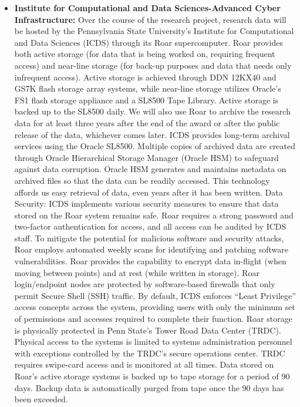 \documentclass[11pt]{article}
\begin{document}
\begin{itemize}
\item \textbf{Institute for Computational and Data Sciences-Advanced Cyber Infrastructure:}
Over the course of the research project, research data will be hosted by the Pennsylvania State University’s Institute for Computational and Data Sciences (ICDS) through its Roar supercomputer. Roar provides both active storage (for data that is being worked on, requiring frequent access) and near-line storage (for back-up purposes and data that needs only infrequent access). Active storage is achieved through DDN 12KX40 and GS7K flash storage array systems, while near-line storage utilizes Oracle’s FS1 flash storage appliance and a SL8500 Tape Library. Active storage is backed up to the SL8500 daily. 
We will also use Roar to archive the research data for at least three years after the end of the award or after the public release of the data, whichever comes later. ICDS provides long-term archival services using the Oracle SL8500. Multiple copies of archived data are created through Oracle Hierarchical Storage Manager (Oracle HSM) to safeguard against data corruption. Oracle HSM generates and maintains metadata on archived files so that the data can be readily accessed. This technology affords us easy retrieval of data, even years after it has been written. 
Data Security: ICDS implements various security measures to ensure that data stored on the Roar system remains safe. Roar requires a strong password and two-factor authentication for access, and all access can be audited by ICDS staff. To mitigate the potential for malicious software and security attacks, Roar employs automated weekly scans for identifying and patching software vulnerabilities. Roar provides the capability to encrypt data in-flight (when moving between points) and at rest (while written in storage). Roar login/endpoint nodes are protected by software-based firewalls that only permit Secure Shell (SSH) traffic. By default, ICDS enforces “Least Privilege” access concepts across the system, providing users with only the minimum set of permissions and accesses required to complete their function. Roar storage is physically protected in Penn State’s Tower Road Data Center (TRDC). Physical access to the systems is limited to systems administration personnel with exceptions controlled by the TRDC’s secure operations center. TRDC requires swipe-card access and is monitored at all times. Data stored on Roar’s active storage systems is backed up to tape storage for a period of 90 days. Backup data is automatically purged from tape once the 90 days has been exceeded. 


\end{itemize}
\end{document}
